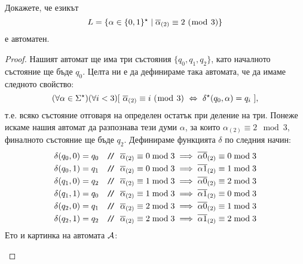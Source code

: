 \begin{problem}
  Докажете, че езикът
  \[L = \{\alpha \in \{0,1\}^\star \mid \overline{\alpha}_{(2)} \equiv 2\ (\bmod\ 3)\}\]
  е автоматен.
\end{problem}
\begin{proof}
  Нашият автомат ще има три състояния $\{q_0,q_1,q_2\}$, като началното състояние ще бъде $q_0$.
  Целта ни е да дефинираме така автомата, че да имаме следното свойство:
  \begin{equation}
    (\forall\alpha\in\Sigma^\star)(\forall i < 3)[\ \ov{\alpha}_{(2)} \equiv i\ (\bmod\ 3)\ \Leftrightarrow\ \delta^\star(q_0,\alpha) = q_i\ ],
  \end{equation}
  т.е. всяко състояние отговаря на определен остатък при деление на три.
  Понеже искаме нашия автомат да разпознава тези думи $\alpha$,
  за които $\alpha_{(2)} \equiv 2\mod 3$, финалното състояние ще бъде $q_2$.
  Дефинираме функцията $\delta$ по следния начин:
  \begin{align*}
    & \delta(q_0,0) = q_0 & \texttt{/}\!\texttt{/}\ {\ \overline{\alpha}_{(2)} \equiv 0 \bmod 3 \implies \overline{\alpha 0}_{(2)} \equiv 0 \bmod 3 }\\
    & \delta(q_0,1) = q_1 & \texttt{/}\!\texttt{/}\ {\ \overline{\alpha}_{(2)} \equiv 0 \bmod 3 \implies \overline{\alpha 1}_{(2)} \equiv 1 \bmod 3 }\\
    & \delta(q_1,0) = q_2 & \texttt{/}\!\texttt{/}\ {\ \overline{\alpha}_{(2)} \equiv 1 \bmod 3 \implies \overline{\alpha 0}_{(2)} \equiv 2 \bmod 3 }\\
    & \delta(q_1,1) = q_0 & \texttt{/}\!\texttt{/}\ {\ \overline{\alpha}_{(2)} \equiv 1 \bmod 3 \implies \overline{\alpha 1}_{(2)} \equiv 0 \bmod 3 }\\
    & \delta(q_2,0) = q_1 & \texttt{/}\!\texttt{/}\ {\ \overline{\alpha}_{(2)} \equiv 2 \bmod 3 \implies \overline{\alpha 0}_{(2)} \equiv 1 \bmod 3 }\\
    & \delta(q_2,1) = q_2 & \texttt{/}\!\texttt{/}\ {\ \overline{\alpha}_{(2)} \equiv 2 \bmod 3 \implies \overline{\alpha 1}_{(2)} \equiv 2 \bmod 3 }
  \end{align*}
  Ето и картинка на автомата $\mathcal{A}$:
  \begin{framed}
  \begin{figure}[H]
    \begin{center}
\end{center}
\end{figure}
\end{framed}
\end{proof}
